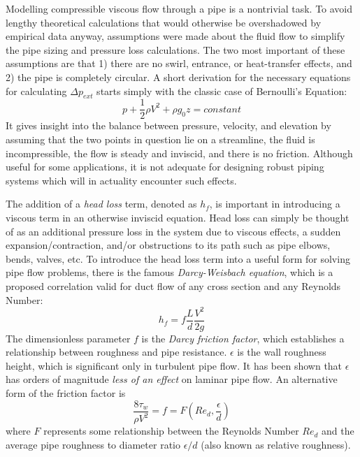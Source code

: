 \documentclass[9pt]{article} %
\numberwithin{equation}{section} %
\begin{document}
\hspace{\parindent} Modelling compressible viscous flow through a pipe is a nontrivial task. To avoid lengthy theoretical calculations that would otherwise be overshadowed by empirical data anyway, assumptions were made about the fluid flow to simplify the pipe sizing and pressure loss calculations. The two most important of these assumptions are that 1) there are no swirl, entrance, or heat-transfer effects, and 2) the pipe is completely circular. A short derivation for the necessary equations for calculating $\Delta p_{ext}$ starts simply with the classic case of Bernoulli's Equation:
\begin{equation} \label{eq:bernoulli}
p + \frac{1}{2} \rho V^{2} + \rho g_{0} z = constant
\end{equation}
It gives insight into the balance between pressure, velocity, and elevation by assuming that the two points in question lie on a streamline, the fluid is incompressible, the flow is steady and inviscid, and there is no friction. Although useful for some applications, it is not adequate for designing robust piping systems which will in actuality encounter such effects.

The addition of a \textit{head loss} term, denoted as $h_{f}$, is important in introducing a viscous term in an otherwise inviscid equation. Head loss can simply be thought of as an additional pressure loss in the system due to viscous effects, a sudden expansion/contraction, and/or obstructions to its path such as pipe elbows, bends, valves, etc. To introduce the head loss term into a useful form for solving pipe flow problems, there is the famous \textit{Darcy-Weisbach equation}, which is a proposed correlation valid for duct flow of any cross section and any Reynolds Number:
\begin{equation} \label{eq:darcy-weisbach}
h_{f} = f{\frac{L}{d}}{\frac{V^{2}}{2{g}}}
\end{equation}
The dimensionless parameter $f$ is the \textit{Darcy friction factor}, which establishes a relationship between roughness and pipe resistance. $\epsilon$ is the wall roughness height, which is significant only in turbulent pipe flow. It has been shown that $\epsilon$ has orders of magnitude \textit{less of an effect} on laminar pipe flow. An alternative form of the friction factor is
\begin{equation} \label{eq:darcy-friction}
\frac{8 \tau_{w}}{\rho V^{2}} = f = F(Re_{d}, \frac{\epsilon}{d})
\end{equation}
where $F$ represents some relationship between the Reynolds Number $Re_{d}$ and the average pipe roughness to diameter ratio $\epsilon / d$ (also known as relative roughness).
\end{document}
